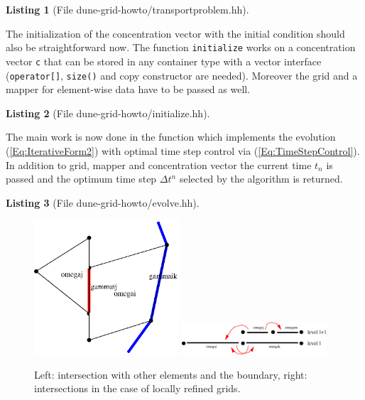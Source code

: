 \documentclass[11pt,a4paper,headinclude,footinclude,DIV16,normalheadings]{scrreprt}
\newtheorem{lst}{Listing}
\begin{document}
\begin{lst}[File dune-grid-howto/transportproblem.hh] \mbox{}
\nopagebreak

\end{lst}

The initialization of the concentration vector with the initial
condition should also be straightforward now. The function
\lstinline!initialize! works on a concentration vector \lstinline!c!
that can be stored in any container type with a vector interface
(\lstinline!operator[]!, \lstinline!size()! and copy constructor are
needed). Moreover the grid and a mapper for element-wise data have to be passed
as well. 

\begin{lst}[File dune-grid-howto/initialize.hh] \mbox{}
\nopagebreak

\end{lst}

The main work is now done in the function which implements the
evolution (\ref{Eq:IterativeForm2}) with optimal time step control via
(\ref{Eq:TimeStepControl}). In addition to grid, mapper and
concentration vector the current time $t_n$ is passed and the optimum
time step $\Delta t^n$ selected by the algorithm is returned.
\begin{lst}[File dune-grid-howto/evolve.hh] \mbox{} \label{List:evolve}
\nopagebreak

\end{lst}

\begin{figure}
\includegraphics[width=0.48\textwidth]{EPS/intersection}\hfill
\includegraphics[width=0.48\textwidth]{EPS/islocalref}
\caption{Left: intersection with other elements and the boundary,
  right: intersections in the case of locally refined grids.}
\label{Fig:IsIt}
\end{figure}
\end{document}
